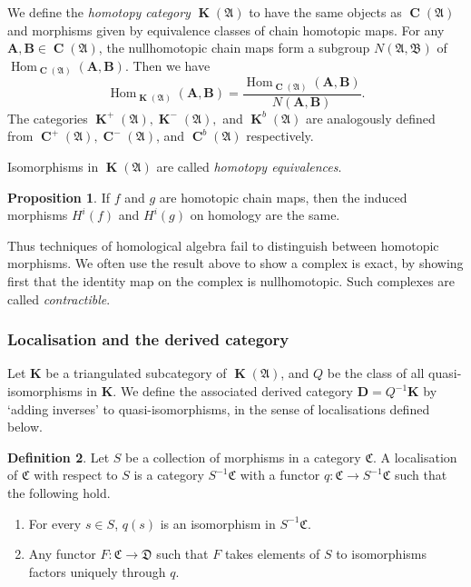 \documentclass[a4paper]{article}
\theoremstyle{definition}
\newtheorem{defn}{Definition}[section]
\newtheorem{prop}[defn]{Proposition}
\theoremstyle{remark}
\DeclareMathOperator{\Hom}{\text{Hom}}
\DeclareMathOperator{\Ch}{\mathbf{C}}
\DeclareMathOperator{\kom}{{\mathbf{K}}}
\newcommand{\deri}{\mathbf{D}}
\begin{document}
We define the \textit{homotopy category} \(\kom(\mathfrak{A})\) to have the same
objects as \(\Ch(\mathfrak{A})\) and morphisms given by equivalence classes of
chain homotopic maps. For any \(\mathbf{A},\mathbf{B}\in \Ch(\mathfrak{A})\),
the nullhomotopic chain maps form a subgroup \(N(\mathfrak{A},\mathfrak{B})\) of
\(\Hom_{\Ch(\mathfrak{A})}(\mathbf{A},\mathbf{B})\). Then we have
\[\Hom_{\kom(\mathfrak{A})}(\mathbf{A},\mathbf{B})=
\frac{\Hom_{\Ch(\mathfrak{A})}(\mathbf{A},\mathbf{B})}{N(\mathbf{A},\mathbf{B})}.\]
The categories \(\kom^+(\mathfrak{A}), \kom^-(\mathfrak{A}),\) and
\(\kom^b(\mathfrak{A})\) are analogously defined from \(\Ch^+(\mathfrak{A}),
\Ch^-(\mathfrak{A})\), and \(\Ch^b(\mathfrak{A})\) respectively.

Isomorphisms in \(\kom(\mathfrak{A})\) are called \textit{homotopy
equivalences}.

\begin{prop}
    If \(f\) and \(g\) are homotopic chain maps, then the induced morphisms
    \(H^i(f)\) and \(H^i(g)\) on homology are the same. 
\end{prop}

Thus techniques of homological algebra fail to distinguish between homotopic
morphisms. We often use the result above to show a complex is exact, by showing
first that the identity map on the complex is nullhomotopic. Such complexes are
called \textit{contractible}.

\subsubsection{Localisation and the derived category}

Let \(\mathbf{K}\) be a triangulated subcategory of \(\kom(\mathfrak{A})\), and
\(Q\) be the class of all quasi-isomorphisms in \(\mathbf{K}\). We
define the associated derived category \(\deri=Q^{-1}\mathbf{K}\) by
`adding inverses' to quasi-isomorphisms, in the sense of localisations defined
below. 

\begin{defn}\label{localisation-defn}
    Let \(S\) be a collection of morphisms in a category \(\mathfrak{C}\). A
    localisation of \(\mathfrak{C}\) with respect to \(S\) is a category
    \(S^{-1}\mathfrak{C}\) with a functor \(q:\mathfrak{C}\rightarrow
    S^{-1}\mathfrak{C}\) such that the following hold.
    \begin{enumerate}
        \item For every \(s\in S\), \(q(s)\) is an isomorphism in
            \(S^{-1}\mathfrak{C}\).
        \item Any functor \(F:\mathfrak{C}\rightarrow \mathfrak{D}\) such that
            \(F\) takes elements of \(S\) to isomorphisms factors uniquely
            through \(q\).
    \end{enumerate}
\end{defn}
\end{document}
